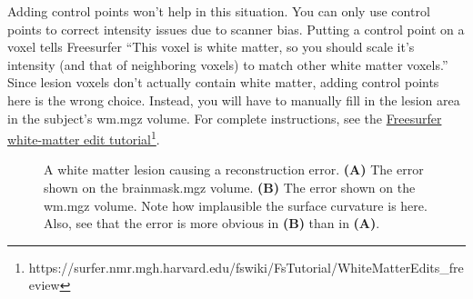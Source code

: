 \documentclass[letterpaper,10pt,openany,oneside]{sphinxmanual}
\begin{document}
Adding control points won't help in this situation. You can only use control
points to correct intensity issues due to scanner bias. Putting a control point
on a voxel tells Freesurfer ``This voxel is white matter, so you should scale
it's intensity (and that of neighboring voxels) to match other white matter
voxels.'' Since lesion voxels don't actually contain white matter, adding
control points here is the wrong choice. Instead, you will have to manually
fill in the lesion area in the subject's wm.mgz volume. For complete
instructions, see the \href{https://surfer.nmr.mgh.harvard.edu/fswiki/FsTutorial/WhiteMatterEdits\_freeview}{Freesurfer white-matter edit tutorial}\footnote{https://surfer.nmr.mgh.harvard.edu/fswiki/FsTutorial/WhiteMatterEdits\_freeview}.
\begin{figure}[htbp]
\centering
\capstart

\caption{A white matter lesion causing a reconstruction error. \textbf{(A)} The error shown
on the brainmask.mgz volume. \textbf{(B)} The error shown on the wm.mgz volume. Note
how implausible the surface curvature is here. Also, see that the error is
more obvious in \textbf{(B)} than in \textbf{(A)}.}\end{figure}
\end{document}

